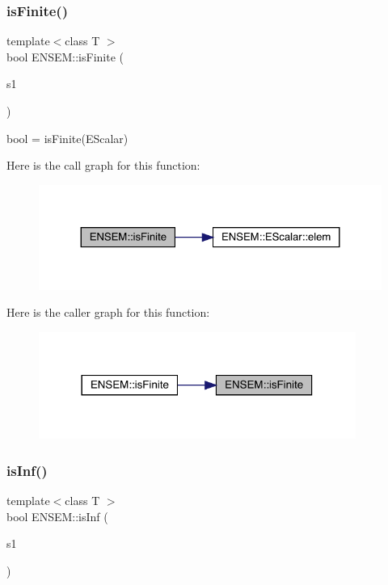 \subsubsection{\texorpdfstring{isFinite()}{isFinite()}}
{\footnotesize\ttfamily template$<$class T $>$ \\
bool E\+N\+S\+E\+M\+::is\+Finite (\begin{DoxyParamCaption}\item[{const \mbox{\hyperlink{classENSEM_1_1EScalar}{E\+Scalar}}$<$ T $>$ \&}]{s1 }\end{DoxyParamCaption})}



bool = is\+Finite(\+E\+Scalar) 

Here is the call graph for this function\+:
\nopagebreak
\begin{figure}[H]
\begin{center}
\leavevmode
\includegraphics[width=324pt]{d4/dca/group__escalar_ga70fcd41007f852c6b90539df7b80af87_cgraph}
\end{center}
\end{figure}
Here is the caller graph for this function\+:
\nopagebreak
\begin{figure}[H]
\begin{center}
\leavevmode
\includegraphics[width=294pt]{d4/dca/group__escalar_ga70fcd41007f852c6b90539df7b80af87_icgraph}
\end{center}
\end{figure}
\mbox{\label{group__escalar_ga323a3743d3621a1c631ad3e52b85acba}} 
\subsubsection{\texorpdfstring{isInf()}{isInf()}}
{\footnotesize\ttfamily template$<$class T $>$ \\
bool E\+N\+S\+E\+M\+::is\+Inf (\begin{DoxyParamCaption}\item[{const \mbox{\hyperlink{classENSEM_1_1EScalar}{E\+Scalar}}$<$ T $>$ \&}]{s1 }\end{DoxyParamCaption})}



